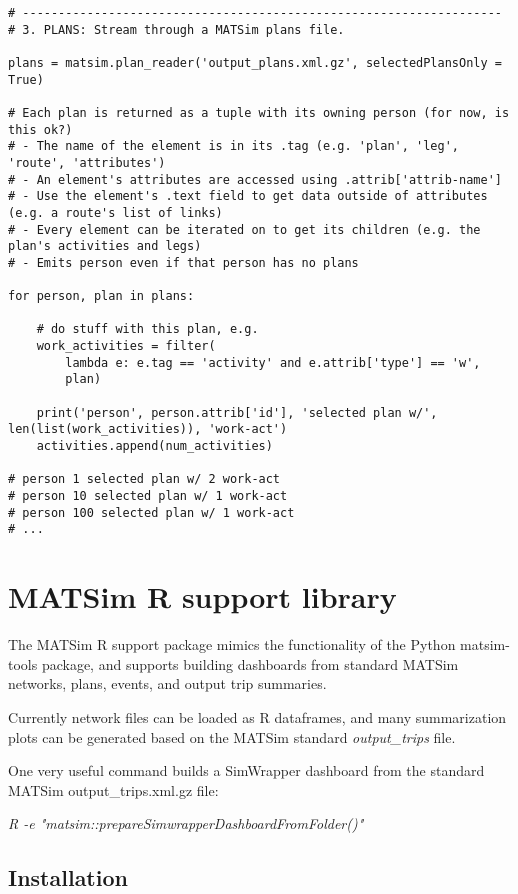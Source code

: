 \begin{lstlisting}
# -------------------------------------------------------------------
# 3. PLANS: Stream through a MATSim plans file.

plans = matsim.plan_reader('output_plans.xml.gz', selectedPlansOnly = True)

# Each plan is returned as a tuple with its owning person (for now, is this ok?)
# - The name of the element is in its .tag (e.g. 'plan', 'leg', 'route', 'attributes')
# - An element's attributes are accessed using .attrib['attrib-name']
# - Use the element's .text field to get data outside of attributes (e.g. a route's list of links)
# - Every element can be iterated on to get its children (e.g. the plan's activities and legs)
# - Emits person even if that person has no plans

for person, plan in plans:

    # do stuff with this plan, e.g.
    work_activities = filter(
        lambda e: e.tag == 'activity' and e.attrib['type'] == 'w',
        plan)

    print('person', person.attrib['id'], 'selected plan w/', len(list(work_activities)), 'work-act')
    activities.append(num_activities)

# person 1 selected plan w/ 2 work-act
# person 10 selected plan w/ 1 work-act
# person 100 selected plan w/ 1 work-act
# ...
\end{lstlisting}


\section{MATSim R support library}
\label{appendix-r}

The MATSim R support package mimics the functionality of the Python matsim-tools package, and supports building dashboards from standard MATSim networks, plans, events, and output trip summaries.

Currently network files can be loaded as R dataframes, and many summarization plots can be generated based on the MATSim standard \emph{output\_trips }file.

One very useful command builds a SimWrapper dashboard from the standard MATSim output\_trips.xml.gz file:

\emph{R -e "matsim::prepareSimwrapperDashboardFromFolder()"}

\subsection{Installation}

